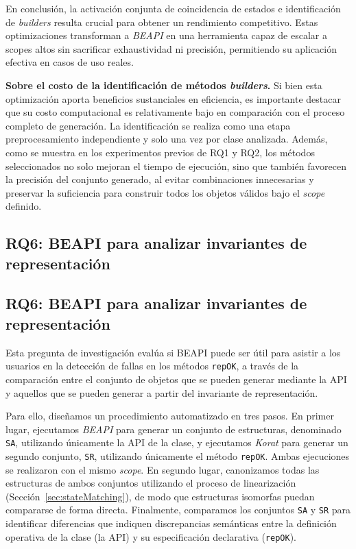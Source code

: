 En conclusión, la activación conjunta de coincidencia de estados e identificación de \emph{builders} 
resulta crucial para obtener un rendimiento competitivo. Estas optimizaciones transforman a \emph{BEAPI} 
en una herramienta capaz de escalar a scopes altos sin sacrificar exhaustividad ni precisión, 
permitiendo su aplicación efectiva en casos de uso reales.

\vspace{8pt}
\noindent
\textbf{Sobre el costo de la identificación de métodos \emph{builders}.} Si bien esta optimización aporta 
beneficios sustanciales en eficiencia, es importante destacar que su costo computacional es relativamente 
bajo en comparación con el proceso completo de generación. La identificación se realiza como una etapa 
preprocesamiento independiente y solo una vez por clase analizada. Además, como se muestra en los experimentos 
previos de RQ1 y RQ2, los métodos seleccionados no solo mejoran el tiempo de ejecución, sino que también 
favorecen la precisión del conjunto generado, al evitar combinaciones innecesarias y preservar la 
suficiencia para construir todos los objetos válidos bajo el \emph{scope} definido.




\subsection{RQ6: BEAPI para analizar invariantes de representación}
\label{sec:existing-specs-analysis}
\subsection{RQ6: BEAPI para analizar invariantes de representación}

Esta pregunta de investigación evalúa si \textsf{BEAPI} puede ser útil para asistir a los usuarios 
en la detección de fallas en los métodos \texttt{repOK}, a través de la comparación entre el conjunto 
de objetos que se pueden generar mediante la API y aquellos que se pueden generar a partir del 
invariante de representación.

Para ello, diseñamos un procedimiento automatizado en tres pasos. En primer lugar, ejecutamos 
\emph{BEAPI} para generar un conjunto de estructuras, denominado \texttt{SA}, utilizando únicamente 
la API de la clase, y ejecutamos \emph{Korat} para generar un segundo conjunto, \texttt{SR}, 
utilizando únicamente el método \texttt{repOK}. Ambas ejecuciones se realizaron con el mismo 
\emph{scope}. En segundo lugar, canonizamos todas las estructuras de ambos conjuntos utilizando el 
proceso de linearización (Sección~\ref{sec:stateMatching}), de modo que estructuras isomorfas puedan 
compararse de forma directa. Finalmente, comparamos los conjuntos \texttt{SA} y \texttt{SR} para 
identificar diferencias que indiquen discrepancias semánticas entre la definición operativa de la 
clase (la API) y su especificación declarativa (\texttt{repOK}).

